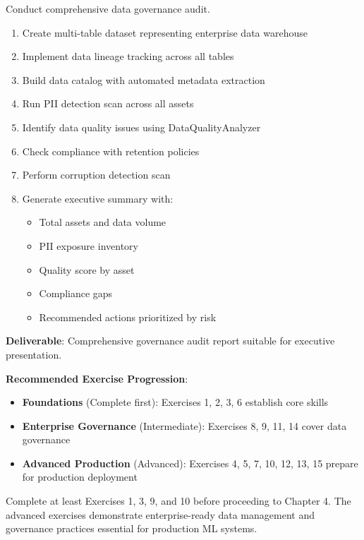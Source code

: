 Conduct comprehensive data governance audit.

\begin{enumerate}
    \item Create multi-table dataset representing enterprise data warehouse
    \item Implement data lineage tracking across all tables
    \item Build data catalog with automated metadata extraction
    \item Run PII detection scan across all assets
    \item Identify data quality issues using DataQualityAnalyzer
    \item Check compliance with retention policies
    \item Perform corruption detection scan
    \item Generate executive summary with:
    \begin{itemize}
        \item Total assets and data volume
        \item PII exposure inventory
        \item Quality score by asset
        \item Compliance gaps
        \item Recommended actions prioritized by risk
    \end{itemize}
\end{enumerate}

\textbf{Deliverable}: Comprehensive governance audit report suitable for executive presentation.

\vspace{1cm}

\textbf{Recommended Exercise Progression}:

\begin{itemize}
    \item \textbf{Foundations} (Complete first): Exercises 1, 2, 3, 6 establish core skills
    \item \textbf{Enterprise Governance} (Intermediate): Exercises 8, 9, 11, 14 cover data governance
    \item \textbf{Advanced Production} (Advanced): Exercises 4, 5, 7, 10, 12, 13, 15 prepare for production deployment
\end{itemize}

Complete at least Exercises 1, 3, 9, and 10 before proceeding to Chapter 4. The advanced exercises demonstrate enterprise-ready data management and governance practices essential for production ML systems.
